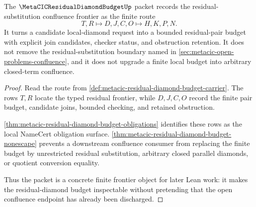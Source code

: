 \begin{theorem}
\label{thm:metacic-residual-diamond-budget-confluence-frontier}
The $\MetaCICResidualDiamondBudgetUp$ packet records the residual-substitution confluence frontier as the finite route
$$
T,R \longmapsto D,J,C,O \longmapsto H,K,P,N .
$$
It turns a candidate local-diamond request into a bounded residual-pair budget with explicit join candidates, checker status, and obstruction retention. It does not remove the residual-substitution boundary named in \autoref{sec:metacic-open-problems-confluence}, and it does not upgrade a finite local budget into arbitrary closed-term confluence.
\end{theorem}
\begin{proof}
Read the route from \autoref{def:metacic-residual-diamond-budget-carrier}. The rows $T,R$ locate the typed residual frontier, while $D,J,C,O$ record the finite pair budget, candidate joins, bounded checking, and retained obstruction.

\autoref{thm:metacic-residual-diamond-budget-obligations} identifies these rows as the local NameCert obligation surface. \autoref{thm:metacic-residual-diamond-budget-nonescape} prevents a downstream confluence consumer from replacing the finite budget by unrestricted residual substitution, arbitrary closed parallel diamonds, or quotient conversion equality.

Thus the packet is a concrete finite frontier object for later Lean work: it makes the residual-diamond budget inspectable without pretending that the open confluence endpoint has already been discharged.
\end{proof}




